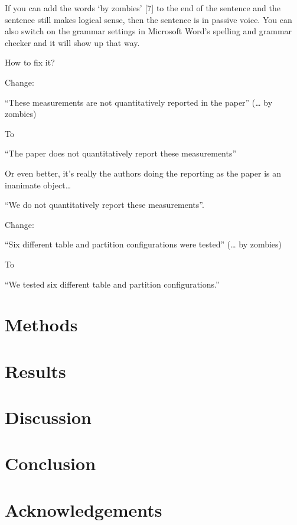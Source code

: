 \documentclass[]{elsarticle} %
\theoremstyle{definition}
\theoremstyle{definition}
\theoremstyle{definition}
\theoremstyle{remark}
\begin{document}
If you can add the words `by zombies' {[}7{]} to the end of the sentence
and the sentence still makes logical sense, then the sentence is in
passive voice. You can also switch on the grammar settings in Microsoft
Word's spelling and grammar checker and it will show up that way.

How to fix it?

Change:

``These measurements are not quantitatively reported in the paper''
(\ldots{} by zombies)

To

``The paper does not quantitatively report these measurements''

Or even better, it's really the authors doing the reporting as the paper
is an inanimate object\ldots{}

``We do not quantitatively report these measurements''.

Change:

``Six different table and partition configurations were tested''
(\ldots{} by zombies)

To

``We tested six different table and partition configurations.''

\hypertarget{methods}{%
\section{Methods}\label{methods}}

\hypertarget{results}{%
\section{Results}\label{results}}

\hypertarget{discussion}{%
\section{Discussion}\label{discussion}}

\hypertarget{conclusion}{%
\section{Conclusion}\label{conclusion}}

\hypertarget{acknowledgements}{%
\section{Acknowledgements}\label{acknowledgements}}
\end{document}
